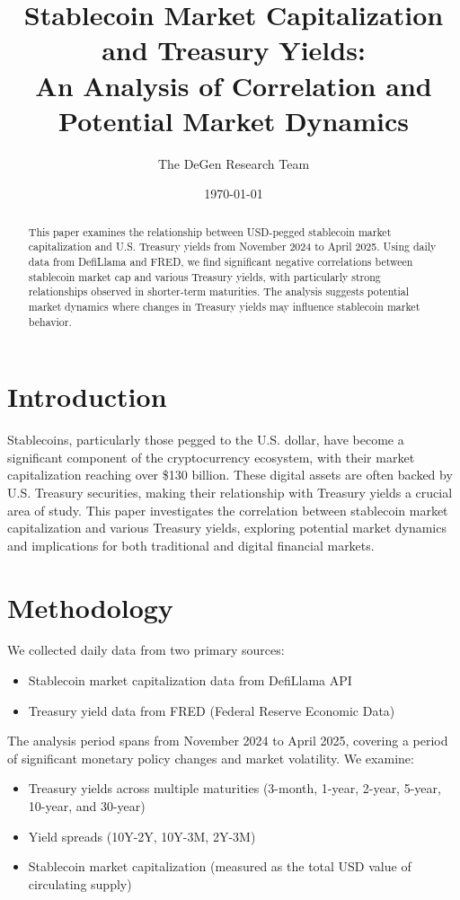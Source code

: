 \documentclass[12pt,a4paper]{article}
\title{Stablecoin Market Capitalization and Treasury Yields:\\
An Analysis of Correlation and Potential Market Dynamics}
\author{The DeGen Research Team}
\date{\today}
\begin{document}
\maketitle

\begin{abstract}
This paper examines the relationship between USD-pegged stablecoin market capitalization and U.S. Treasury yields from November 2024 to April 2025. Using daily data from DefiLlama and FRED, we find significant negative correlations between stablecoin market cap and various Treasury yields, with particularly strong relationships observed in shorter-term maturities. The analysis suggests potential market dynamics where changes in Treasury yields may influence stablecoin market behavior.
\end{abstract}

\section{Introduction}
Stablecoins, particularly those pegged to the U.S. dollar, have become a significant component of the cryptocurrency ecosystem, with their market capitalization reaching over \$130 billion. These digital assets are often backed by U.S. Treasury securities, making their relationship with Treasury yields a crucial area of study. This paper investigates the correlation between stablecoin market capitalization and various Treasury yields, exploring potential market dynamics and implications for both traditional and digital financial markets.

\section{Methodology}
We collected daily data from two primary sources:
\begin{itemize}
    \item Stablecoin market capitalization data from DefiLlama API
    \item Treasury yield data from FRED (Federal Reserve Economic Data)
\end{itemize}

The analysis period spans from November 2024 to April 2025, covering a period of significant monetary policy changes and market volatility. We examine:
\begin{itemize}
    \item Treasury yields across multiple maturities (3-month, 1-year, 2-year, 5-year, 10-year, and 30-year)
    \item Yield spreads (10Y-2Y, 10Y-3M, 2Y-3M)
    \item Stablecoin market capitalization (measured as the total USD value of circulating supply)
\end{itemize}
\end{document}
